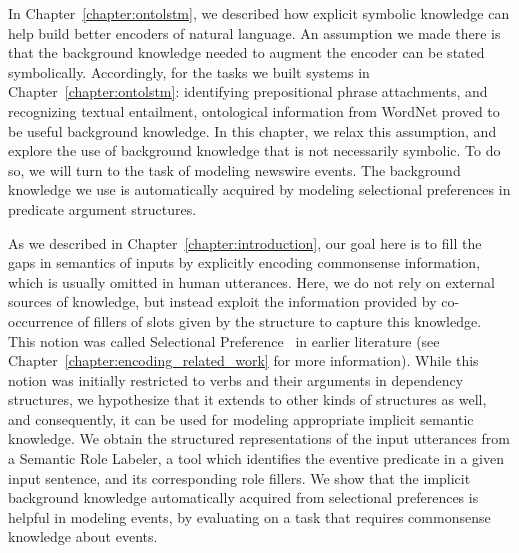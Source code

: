 In Chapter~\ref{chapter:ontolstm}, we described how explicit symbolic knowledge
can help build better encoders of natural language.  An assumption we made there
is that the background knowledge needed to augment the encoder can be stated
symbolically. Accordingly, for the tasks we built systems in
Chapter~\ref{chapter:ontolstm}: identifying prepositional phrase attachments,
and recognizing textual entailment, ontological information from WordNet proved
to be useful background knowledge. In this chapter, we relax this assumption,
and explore the use of background knowledge that is not necessarily symbolic. To
do so, we will turn to the task of modeling newswire events. 
The background knowledge we use is automatically acquired by
modeling selectional preferences in predicate argument structures.

As we described in Chapter~\ref{chapter:introduction}, our goal here is to fill
the gaps in semantics of inputs by explicitly encoding commonsense information,
which is usually omitted in human utterances. Here, we do not rely on external
sources of knowledge, but instead exploit the information provided by
co-occurrence of fillers of slots given by the structure to capture this
knowledge. This notion was called Selectional
Preference~\citep{wilks1973preference} in earlier literature (see
Chapter~\ref{chapter:encoding_related_work} for more information). While this
notion was initially restricted to verbs and their arguments in dependency
structures, we hypothesize that it extends to other kinds of structures as well,
and consequently, it can be used for modeling appropriate implicit semantic
knowledge. We obtain the structured representations of the
input utterances from a Semantic Role Labeler, a tool which identifies the
eventive predicate in a given input sentence, and its corresponding role
fillers. We show that the implicit background
knowledge automatically acquired from selectional preferences is helpful in
modeling events, by evaluating on a task that requires commonsense knowledge
about events.

